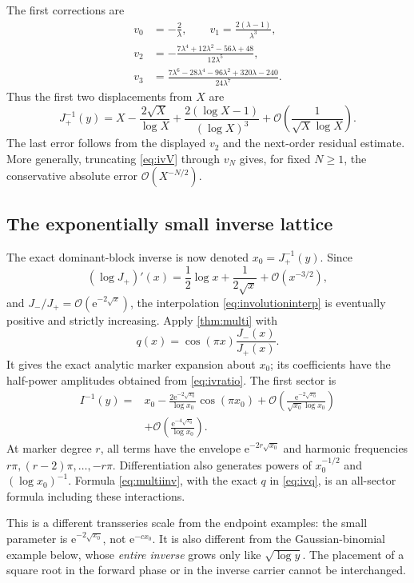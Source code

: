\documentclass[11pt,a4paper]{article}
\theoremstyle{definition}
\theoremstyle{remark}
\newcommand{\ee}{\mathrm e}
\newcommand{\OO}{\mathcal O}
\numberwithin{equation}{section}
\begin{document}
The first corrections are
\begin{align}
 v_0&=-\frac2\lambda,\qquad
 v_1=\frac{2(\lambda-1)}{\lambda^3},\nonumber\\
 v_2&=-\frac{7\lambda^4+12\lambda^2-56\lambda+48}{12\lambda^5},\label{eq:ivvfirst}\\
 v_3&=\frac{7\lambda^6-28\lambda^4-96\lambda^2+320\lambda-240}{24\lambda^7}.
 \nonumber
\end{align}
Thus the first two displacements from $X$ are
\begin{equation}
 J_+^{-1}(y)=X-\frac{2\sqrt X}{\log X}
 +\frac{2(\log X-1)}{(\log X)^3}
 +\OO\!\left(\frac1{\sqrt X\log X}\right).
 \label{eq:ivinvfirst}
\end{equation}
The last error follows from the displayed $v_2$ and the next-order residual estimate. More generally, truncating \eqref{eq:ivV} through $v_N$ gives, for fixed $N\ge1$, the conservative absolute error $\OO(X^{-N/2})$.

\subsection{The exponentially small inverse lattice}
The exact dominant-block inverse is now denoted $x_0=J_+^{-1}(y)$. Since
\[
 (\log J_+)'(x)=\frac12\log x+\frac1{2\sqrt x}+\OO(x^{-3/2}),
\]
and $J_-/J_+=\OO(\ee^{-2\sqrt x})$, the interpolation \eqref{eq:involutioninterp} is eventually positive and strictly increasing. Apply \cref{thm:multi} with
\begin{equation}
 q(x)=\cos(\pi x)\frac{J_-(x)}{J_+(x)}.
 \label{eq:ivq}
\end{equation}
It gives the exact analytic marker expansion about $x_0$; its coefficients have the half-power amplitudes obtained from \eqref{eq:ivratio}. The first sector is
\begin{align}
 I^{-1}(y)={}&x_0-
 \frac{2\ee^{-2\sqrt{x_0}}}{\log x_0}\cos(\pi x_0)
 +\OO\!\left(\frac{\ee^{-2\sqrt{x_0}}}{\sqrt{x_0}\log x_0}\right)\nonumber\\
 &+\OO\!\left(\frac{\ee^{-4\sqrt{x_0}}}{\log x_0}\right).
 \label{eq:ivexpinverse}
\end{align}
At marker degree $r$, all terms have the envelope $\ee^{-2r\sqrt{x_0}}$ and harmonic frequencies $r\pi,(r-2)\pi,\ldots,-r\pi$. Differentiation also generates powers of $x_0^{-1/2}$ and $(\log x_0)^{-1}$. Formula \eqref{eq:multiinv}, with the exact $q$ in \eqref{eq:ivq}, is an all-sector formula including these interactions.

This is a different transseries scale from the endpoint examples: the small parameter is $\ee^{-2\sqrt{x_0}}$, not $\ee^{-c x_0}$. It is also different from the Gaussian-binomial example below, whose \emph{entire inverse} grows only like $\sqrt{\log y}$. The placement of a square root in the forward phase or in the inverse carrier cannot be interchanged.
\end{document}
